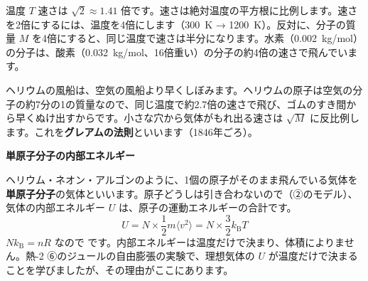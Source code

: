 \begin{phbaisuru}{温度 $T$}
速さは $\sqrt2\approx1.41$ 倍です。速さは絶対温度の平方根に比例します。速さを2倍にするには、温度を4倍にします（\qty{300}{K} → \qty{1200}{K}）。反対に、分子の質量 $M$ を4倍にすると、同じ温度で速さは半分になります。水素（\qty{0.002}{kg/mol}）の分子は、酸素（\qty{0.032}{kg/mol}、16倍重い）の分子の約4倍の速さで飛んでいます。
\par\vspace{2pt}\centering
{}
\end{phbaisuru}

\begin{phmijika}[軽い分子ほど速く逃げる]
ヘリウムの風船は、空気の風船より早くしぼみます。ヘリウムの原子は空気の分子の約7分の1の質量なので、同じ温度で約2.7倍の速さで飛び、ゴムのすき間から早くぬけ出すからです。小さな穴から気体がもれ出る速さは $\sqrt{M}$ に反比例します。これを\textbf{グレアムの法則}といいます（1846年ごろ）。
\end{phmijika}


\leavevmode\label{ph:熱-14:sec4}\noindent\textbf{単原子分子の内部エネルギー}\par\nobreak
ヘリウム・ネオン・アルゴンのように、1個の原子がそのまま飛んでいる気体を\textbf{単原子分子}の気体といいます。原子どうしは引き合わないので（②のモデル）、気体の内部エネルギー $U$ は、原子の運動エネルギーの合計です。
\[ U=N\times\frac{1}{2}m\langle v^2\rangle=N\times\frac{3}{2}k_{\mathrm B}T \]
$Nk_{\mathrm B}=nR$ なので
\label{ph:熱-14:U}です。内部エネルギーは温度だけで決まり、体積によりません。熱-2 ⑥のジュールの自由膨張の実験で、理想気体の $U$ が温度だけで決まることを学びましたが、その理由がここにあります。

